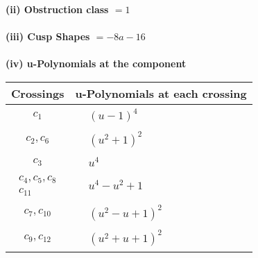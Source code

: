 \documentclass[1p]{elsarticle_modified}
\theoremstyle{definition}
\begin{document}
\flushleft \textbf{(ii) Obstruction class $= 1$}\\~\\
\flushleft \textbf{(iii) Cusp Shapes $= -8 a-16$}\\~\\
\newpage\renewcommand{\arraystretch}{1}
\flushleft \textbf{(iv) u-Polynomials at the component}\newline \\
\begin{tabular}{m{50pt}|m{274pt}}
Crossings & \hspace{64pt}u-Polynomials at each crossing \\
\hline $$\begin{aligned}c_{1}\end{aligned}$$&$\begin{aligned}
&(u-1)^4
\end{aligned}$\\
\hline $$\begin{aligned}c_{2},c_{6}\end{aligned}$$&$\begin{aligned}
&(u^2+1)^2
\end{aligned}$\\
\hline $$\begin{aligned}c_{3}\end{aligned}$$&$\begin{aligned}
&u^4
\end{aligned}$\\
\hline $$\begin{aligned}c_{4},c_{5},c_{8}\\c_{11}\end{aligned}$$&$\begin{aligned}
&u^4- u^2+1
\end{aligned}$\\
\hline $$\begin{aligned}c_{7},c_{10}\end{aligned}$$&$\begin{aligned}
&(u^2- u+1)^2
\end{aligned}$\\
\hline $$\begin{aligned}c_{9},c_{12}\end{aligned}$$&$\begin{aligned}
&(u^2+u+1)^2
\end{aligned}$\\
\hline
\end{tabular}\\~\\
\end{document}
